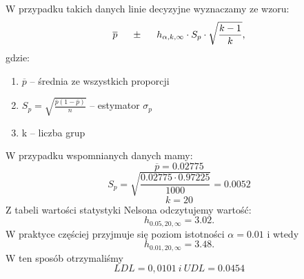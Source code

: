 \documentclass{beamer}
\begin{document}
\begin{frame}
\begin{center}
\end{center}
\end{frame} 

\begin{frame}
W przypadku takich danych linie decyzyjne wyznaczamy ze wzoru:
$$ \overline{p}\hspace{5mm} \pm\hspace{5mm} h_{\alpha,k,\infty}\cdot S_p\cdot\sqrt{\frac{k-1}{k}},$$
gdzie: 
\begin{enumerate}
		\item[] $\overline{p}$ -- średnia ze wszystkich proporcji %
		\item[] $S_p=\sqrt{\frac{\overline{p}\left(1-\overline{p}  \right)}{n}}$ -- estymator $\sigma_p$
		\item[] k -- liczba grup
	\end{enumerate} 
\end{frame}

\begin{frame}
W przypadku wspomnianych danych mamy:
$$\overline{p}=0.02775 $$
$$S_p=\sqrt{\frac{0.02775\cdot 0.97225}{1000}}=0.0052   $$
$$k=20$$
Z tabeli wartości statystyki Nelsona odczytujemy wartość: $$h_{0.05,20,\infty}=3.02.$$
W praktyce częściej przyjmuje się poziom istotności $\alpha=0.01$  i wtedy
$$h_{0.01,20,\infty}=3.48.$$
W ten sposób otrzymaliśmy $$LDL=0,0101\ i\ UDL=0.0454$$
\end{frame}
\end{document}
